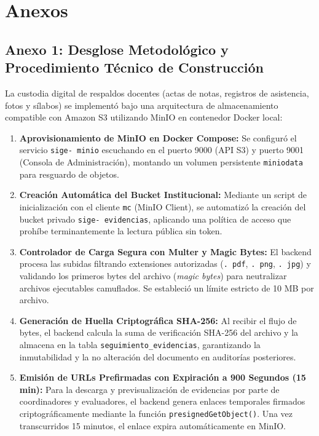 \documentclass[12pt,a4paper]{article}
\begin{document}
\vspace{0.4cm}

\section{Anexos}

\subsection*{Anexo 1: Desglose Metodológico y Procedimiento Técnico de Construcción}
La custodia digital de respaldos docentes (actas de notas, registros de asistencia, fotos y sílabos) se implementó bajo una arquitectura de almacenamiento compatible con Amazon S3 utilizando MinIO en contenedor Docker local:

\begin{enumerate}[leftmargin=1.5em, itemsep=3pt]
    \item \textbf{Aprovisionamiento de MinIO en Docker Compose:} Se configuró el servicio \texttt{sige- minio} escuchando en el puerto 9000 (API S3) y puerto 9001 (Consola de Administración), montando un volumen persistente \texttt{miniodata} para resguardo de objetos.
    \item \textbf{Creación Automática del Bucket Institucional:} Mediante un script de inicialización con el cliente \texttt{mc} (MinIO Client), se automatizó la creación del bucket privado \texttt{sige- evidencias}, aplicando una política de acceso que prohíbe terminantemente la lectura pública sin token.
    \item \textbf{Controlador de Carga Segura con Multer y Magic Bytes:} El backend procesa las subidas filtrando extensiones autorizadas (\texttt{. pdf}, \texttt{. png}, \texttt{. jpg}) y validando los primeros bytes del archivo (\textit{magic bytes}) para neutralizar archivos ejecutables camuflados. Se estableció un límite estricto de 10 MB por archivo.
    \item \textbf{Generación de Huella Criptográfica SHA-256:} Al recibir el flujo de bytes, el backend calcula la suma de verificación SHA-256 del archivo y la almacena en la tabla \texttt{seguimiento\_\allowbreak  evidencias}, garantizando la inmutabilidad y la no alteración del documento en auditorías posteriores.
    \item \textbf{Emisión de URLs Prefirmadas con Expiración a 900 Segundos (15 min):} Para la descarga y previsualización de evidencias por parte de coordinadores y evaluadores, el backend genera enlaces temporales firmados criptográficamente mediante la función \texttt{presigned}\allowbreak\texttt{GetObject()}. Una vez transcurridos 15 minutos, el enlace expira automáticamente en MinIO.
\end{enumerate}
\end{document}
